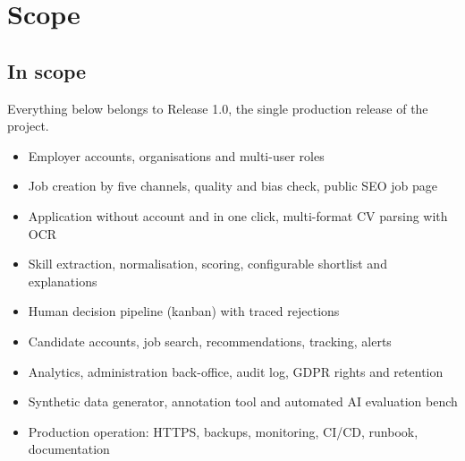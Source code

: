 \documentclass[11pt,a4paper]{article}
\begin{document}
\section{Scope}
\subsection{In scope}
Everything below belongs to Release 1.0, the single production release of the project.
\begin{itemize}
  \item Employer accounts, organisations and multi-user roles
  \item Job creation by five channels, quality and bias check, public SEO job page
  \item Application without account and in one click, multi-format CV parsing with OCR
  \item Skill extraction, normalisation, scoring, configurable shortlist and explanations
  \item Human decision pipeline (kanban) with traced rejections
  \item Candidate accounts, job search, recommendations, tracking, alerts
  \item Analytics, administration back-office, audit log, GDPR rights and retention
  \item Synthetic data generator, annotation tool and automated AI evaluation bench
  \item Production operation: HTTPS, backups, monitoring, CI/CD, runbook, documentation
\end{itemize}
\end{document}
